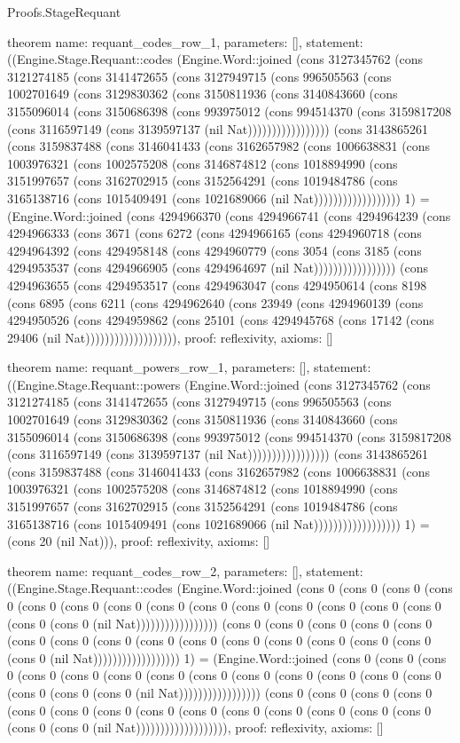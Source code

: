 \begin{lexlean}{Proofs.StageRequant}
\begin{semanticmodule}
theorem{
  name: requant_codes_row_1,
  parameters: [],
  statement: ((Engine.Stage.Requant::codes (Engine.Word::joined (cons 3127345762 (cons 3121274185 (cons 3141472655 (cons 3127949715 (cons 996505563 (cons 1002701649 (cons 3129830362 (cons 3150811936 (cons 3140843660 (cons 3155096014 (cons 3150686398 (cons 993975012 (cons 994514370 (cons 3159817208 (cons 3116597149 (cons 3139597137 (nil Nat))))))))))))))))) (cons 3143865261 (cons 3159837488 (cons 3146041433 (cons 3162657982 (cons 1006638831 (cons 1003976321 (cons 1002575208 (cons 3146874812 (cons 1018894990 (cons 3151997657 (cons 3162702915 (cons 3152564291 (cons 1019484786 (cons 3165138716 (cons 1015409491 (cons 1021689066 (nil Nat)))))))))))))))))) 1) = (Engine.Word::joined (cons 4294966370 (cons 4294966741 (cons 4294964239 (cons 4294966333 (cons 3671 (cons 6272 (cons 4294966165 (cons 4294960718 (cons 4294964392 (cons 4294958148 (cons 4294960779 (cons 3054 (cons 3185 (cons 4294953537 (cons 4294966905 (cons 4294964697 (nil Nat))))))))))))))))) (cons 4294963655 (cons 4294953517 (cons 4294963047 (cons 4294950614 (cons 8198 (cons 6895 (cons 6211 (cons 4294962640 (cons 23949 (cons 4294960139 (cons 4294950526 (cons 4294959862 (cons 25101 (cons 4294945768 (cons 17142 (cons 29406 (nil Nat))))))))))))))))))),
  proof: reflexivity{},
  axioms: []
}

theorem{
  name: requant_powers_row_1,
  parameters: [],
  statement: ((Engine.Stage.Requant::powers (Engine.Word::joined (cons 3127345762 (cons 3121274185 (cons 3141472655 (cons 3127949715 (cons 996505563 (cons 1002701649 (cons 3129830362 (cons 3150811936 (cons 3140843660 (cons 3155096014 (cons 3150686398 (cons 993975012 (cons 994514370 (cons 3159817208 (cons 3116597149 (cons 3139597137 (nil Nat))))))))))))))))) (cons 3143865261 (cons 3159837488 (cons 3146041433 (cons 3162657982 (cons 1006638831 (cons 1003976321 (cons 1002575208 (cons 3146874812 (cons 1018894990 (cons 3151997657 (cons 3162702915 (cons 3152564291 (cons 1019484786 (cons 3165138716 (cons 1015409491 (cons 1021689066 (nil Nat)))))))))))))))))) 1) = (cons 20 (nil Nat))),
  proof: reflexivity{},
  axioms: []
}

theorem{
  name: requant_codes_row_2,
  parameters: [],
  statement: ((Engine.Stage.Requant::codes (Engine.Word::joined (cons 0 (cons 0 (cons 0 (cons 0 (cons 0 (cons 0 (cons 0 (cons 0 (cons 0 (cons 0 (cons 0 (cons 0 (cons 0 (cons 0 (cons 0 (cons 0 (nil Nat))))))))))))))))) (cons 0 (cons 0 (cons 0 (cons 0 (cons 0 (cons 0 (cons 0 (cons 0 (cons 0 (cons 0 (cons 0 (cons 0 (cons 0 (cons 0 (cons 0 (cons 0 (nil Nat)))))))))))))))))) 1) = (Engine.Word::joined (cons 0 (cons 0 (cons 0 (cons 0 (cons 0 (cons 0 (cons 0 (cons 0 (cons 0 (cons 0 (cons 0 (cons 0 (cons 0 (cons 0 (cons 0 (cons 0 (nil Nat))))))))))))))))) (cons 0 (cons 0 (cons 0 (cons 0 (cons 0 (cons 0 (cons 0 (cons 0 (cons 0 (cons 0 (cons 0 (cons 0 (cons 0 (cons 0 (cons 0 (cons 0 (nil Nat))))))))))))))))))),
  proof: reflexivity{},
  axioms: []
}


\end{semanticmodule}
\end{lexlean}
